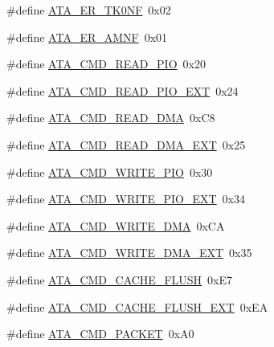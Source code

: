 \begin{DoxyCompactItemize}
\item 
\#define \hyperlink{a00023_aaffca74832da09d4cf0ea68624546c91_aaffca74832da09d4cf0ea68624546c91}{A\+T\+A\+\_\+\+E\+R\+\_\+\+T\+K0\+NF}~0x02
\item 
\#define \hyperlink{a00023_ac4f0c06f285d99068cbad7b6d4641d1f_ac4f0c06f285d99068cbad7b6d4641d1f}{A\+T\+A\+\_\+\+E\+R\+\_\+\+A\+M\+NF}~0x01
\item 
\#define \hyperlink{a00023_a91a96db8427a8caa254a218f05dcb3f4_a91a96db8427a8caa254a218f05dcb3f4}{A\+T\+A\+\_\+\+C\+M\+D\+\_\+\+R\+E\+A\+D\+\_\+\+P\+IO}~0x20
\item 
\#define \hyperlink{a00023_a3165497b4d8eb30297a4d62e39846b01_a3165497b4d8eb30297a4d62e39846b01}{A\+T\+A\+\_\+\+C\+M\+D\+\_\+\+R\+E\+A\+D\+\_\+\+P\+I\+O\+\_\+\+E\+XT}~0x24
\item 
\#define \hyperlink{a00023_aefab351e75e10b6dbfa0b7828031cda4_aefab351e75e10b6dbfa0b7828031cda4}{A\+T\+A\+\_\+\+C\+M\+D\+\_\+\+R\+E\+A\+D\+\_\+\+D\+MA}~0x\+C8
\item 
\#define \hyperlink{a00023_a42247550c708b2b7852927180c7dde78_a42247550c708b2b7852927180c7dde78}{A\+T\+A\+\_\+\+C\+M\+D\+\_\+\+R\+E\+A\+D\+\_\+\+D\+M\+A\+\_\+\+E\+XT}~0x25
\item 
\#define \hyperlink{a00023_a64f2c50b916f1f67018c36f75f811cc7_a64f2c50b916f1f67018c36f75f811cc7}{A\+T\+A\+\_\+\+C\+M\+D\+\_\+\+W\+R\+I\+T\+E\+\_\+\+P\+IO}~0x30
\item 
\#define \hyperlink{a00023_ac8e433782c7125e6929673907eca6f17_ac8e433782c7125e6929673907eca6f17}{A\+T\+A\+\_\+\+C\+M\+D\+\_\+\+W\+R\+I\+T\+E\+\_\+\+P\+I\+O\+\_\+\+E\+XT}~0x34
\item 
\#define \hyperlink{a00023_a41dc931ac3c2c6733a2a67d03eaf1674_a41dc931ac3c2c6733a2a67d03eaf1674}{A\+T\+A\+\_\+\+C\+M\+D\+\_\+\+W\+R\+I\+T\+E\+\_\+\+D\+MA}~0x\+CA
\item 
\#define \hyperlink{a00023_a3a75d9e39518e704f3a4b39e6a3d998c_a3a75d9e39518e704f3a4b39e6a3d998c}{A\+T\+A\+\_\+\+C\+M\+D\+\_\+\+W\+R\+I\+T\+E\+\_\+\+D\+M\+A\+\_\+\+E\+XT}~0x35
\item 
\#define \hyperlink{a00023_a23e8deb17b95336898b52cc76d5206af_a23e8deb17b95336898b52cc76d5206af}{A\+T\+A\+\_\+\+C\+M\+D\+\_\+\+C\+A\+C\+H\+E\+\_\+\+F\+L\+U\+SH}~0x\+E7
\item 
\#define \hyperlink{a00023_a3c624c2041a51a473bd6e77b7753d475_a3c624c2041a51a473bd6e77b7753d475}{A\+T\+A\+\_\+\+C\+M\+D\+\_\+\+C\+A\+C\+H\+E\+\_\+\+F\+L\+U\+S\+H\+\_\+\+E\+XT}~0x\+EA
\item 
\#define \hyperlink{a00023_afaaead63f9b69425b9f6514b03f0bbb2_afaaead63f9b69425b9f6514b03f0bbb2}{A\+T\+A\+\_\+\+C\+M\+D\+\_\+\+P\+A\+C\+K\+ET}~0x\+A0

\end{DoxyCompactItemize}

